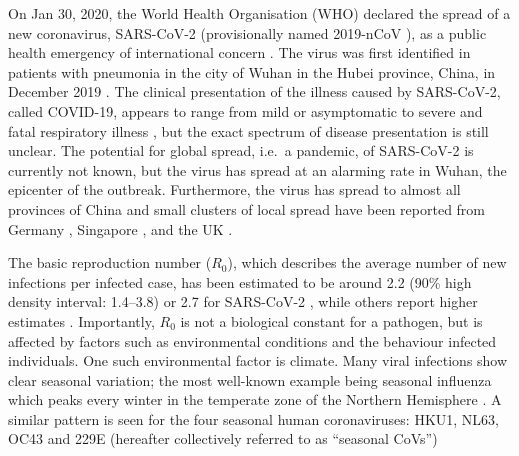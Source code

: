\documentclass[rmp, reprint, superscriptaddress, floatfix,amsmath]{revtex4-1}
\newcommand{\Robert}[1]{{\color{celestialblue}Robert: #1}}
\newcommand{\Jan}[1]{{\color{deepsaffron}Jan: #1}}
\begin{document}
On Jan 30, 2020, the World Health Organisation (WHO) declared the spread of a new coronavirus, SARS-CoV-2 (provisionally named 2019-nCoV \citep{ICTV_SARS-CoV-2}), as a public health emergency of international concern \citep{WHO_situation_report}.
The virus was first identified in patients with pneumonia in the city of Wuhan in the Hubei province, China, in December 2019 \citep{Liangjun2020rna}.
The clinical presentation of the illness caused by SARS-CoV-2, called COVID-19,
appears to range from mild or asymptomatic to severe and fatal respiratory illness \citep{WHO2020situation_report}, but the exact spectrum of disease presentation is still unclear. 
The potential for global spread, i.e.~a pandemic, of SARS-CoV-2 is currently not known, but the virus has spread at an alarming rate in Wuhan, the epicenter of the outbreak. Furthermore, the virus has spread to almost all provinces of China \citep{ECDC_situation_update} and small clusters of local spread have been reported from Germany \citep{rothe2020transmission}, Singapore \citep{MOH_Singapore}, and the UK \citep{WHO_situation_report}.

The basic reproduction number ($R_0$), which describes the average number of new infections per infected case, has been estimated to be around 2.2 (90\% high density interval: 1.4–3.8) or 2.7 for SARS-CoV-2 \citep{Riou2020pattern,wu_nowcasting_2020}, while others report higher estimates \citep{yang_epidemiological_2020}. Importantly, $R_0$ is not a biological constant for a pathogen, but is affected by factors such as environmental conditions and the behaviour infected individuals. One such environmental factor is climate. Many viral infections show clear seasonal variation; the most well-known example being seasonal influenza which peaks every winter in the temperate zone of the Northern Hemisphere \citep{petrova_evolution_2018}. 
A similar pattern is seen for the four seasonal human coronaviruses: HKU1, NL63, OC43 and 229E (hereafter collectively referred to as ``seasonal CoVs'') \citep{killerby2018human} %
\citep{goes2019typical} %
\citep{galanti2019longitudinal} %
\citep{friedman2018human} %
\citep{al2016diversity} %
\citep{huang2017epidemiology} %
\end{document}
